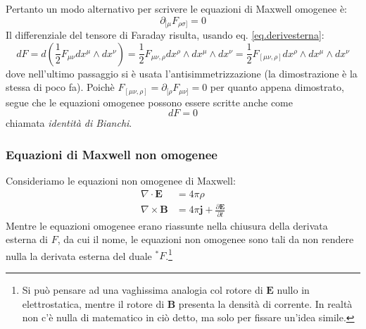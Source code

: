 Pertanto un modo alternativo per scrivere le equazioni di Maxwell omogenee è:
\begin{equation*}
    \partial_{[\mu} F_{\rho\sigma]} = 0
\end{equation*}
Il differenziale del tensore di Faraday risulta, usando eq. \ref{eq.derivesterna}:
\begin{equation*}
    dF= d(\frac{1}{2}F_{\mu\nu}dx^\mu \wedge dx^\nu) =\frac{1}{2}F_{\mu\nu,\rho} dx^\rho \wedge dx^\mu \wedge dx^\nu = \frac{1}{2}F_{[\mu\nu,\rho]} dx^\rho \wedge dx^\mu \wedge dx^\nu  
\end{equation*}
dove nell'ultimo passaggio si è usata l'antisimmetrizzazione (la dimostrazione è la stessa di poco fa). Poichè $F_{[\mu\nu,\rho]} = \partial_{[\rho} F_{\mu\nu]} = 0$ per quanto appena dimostrato, segue che le equazioni omogenee possono essere scritte anche come
\begin{equation}
    dF = 0
    \label{eq.idbianchi}
\end{equation}
chiamata \textit{identità di Bianchi}.

\subsubsection{Equazioni di Maxwell non omogenee}
Consideriamo le equazioni non omogenee di Maxwell:
\begin{align}
    \nabla \cdot \bm{E} &= 4\pi \rho \label{eq.divE} \\
    \nabla \times \bm{B} &= 4\pi \bm{j} + \frac{\partial \bm{E}}{\partial t} \label{eq.rotB}
\end{align}
Mentre le equazioni omogenee erano riassunte nella chiusura della derivata esterna di $F$, da cui il nome, le equazioni non omogenee sono tali da non rendere nulla la derivata esterna del duale $^*F$.\footnote{Si può pensare ad una vaghissima analogia col rotore di $\bm{E}$ nullo in elettrostatica, mentre il rotore di $\bm{B}$ presenta la densità di corrente. In realtà non c'è nulla di matematico in ciò detto, ma solo per fissare un'idea simile.}

